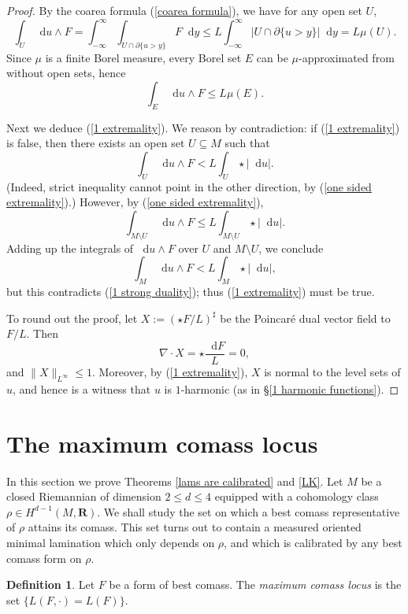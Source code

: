\documentclass[reqno,11pt]{amsart}
\newcommand{\RR}{\mathbf{R}}
\newcommand*\dif{\mathop{}\!\mathrm{d}}
\newcommand{\dfn}[1]{\emph{#1}\index{#1}}
\theoremstyle{definition}
\newtheorem{definition}[theorem]{Definition}
\numberwithin{equation}{section}
\begin{document}
\begin{proof}
By the coarea formula (\ref{coarea formula}), we have for any open set $U$,
$$\int_U \dif u \wedge F = \int_{-\infty}^\infty \int_{U \cap \partial \{u > y\}} F \dif y \leq L \int_{-\infty}^\infty |U \cap \partial \{u > y\}| \dif y = L \mu(U).$$
Since $\mu$ is a finite Borel measure, every Borel set $E$ can be $\mu$-approximated from without open sets, hence
\begin{equation}\label{one sided extremality}
\int_E \dif u \wedge F \leq L \mu(E).
\end{equation}

Next we deduce (\ref{1 extremality}).
We reason by contradiction: if (\ref{1 extremality}) is false, then there exists an open set $U \subseteq M$ such that 
$$\int_U \dif u \wedge F < L \int_U \star |\dif u|.$$
(Indeed, strict inequality cannot point in the other direction, by (\ref{one sided extremality}).)
However, by (\ref{one sided extremality}), 
$$\int_{M \setminus U} \dif u \wedge F \leq L \int_{M \setminus U} \star |\dif u|.$$
Adding up the integrals of $\dif u \wedge F$ over $U$ and $M \setminus U$, we conclude 
$$\int_M \dif u \wedge F < L \int_M \star |\dif u|,$$
but this contradicts (\ref{1 strong duality}); thus (\ref{1 extremality}) must be true.

To round out the proof, let $X := (\star F/L)^\sharp$ be the Poincar\'e dual vector field to $F/L$. Then
$$\nabla \cdot X = \star \frac{\dif F}{L} = 0,$$
and $\|X\|_{L^\infty} \leq 1$.
Moreover, by (\ref{1 extremality}), $X$ is normal to the level sets of $u$, and hence is a witness that $u$ is $1$-harmonic (as in \S\ref{1 harmonic functions}).
\end{proof}



\section{The maximum comass locus}\label{MCL sec}
In this section we prove Theorems \ref{lams are calibrated} and \ref{LK}.
Let $M$ be a closed Riemannian of dimension $2 \leq d \leq 4$ equipped with a cohomology class $\rho \in H^{d - 1}(M, \RR)$.
We shall study the set on which a best comass representative of $\rho$ attains its comass.
This set turns out to contain a measured oriented minimal lamination which only depends on $\rho$, and which is calibrated by any best comass form on $\rho$.

\begin{definition}
Let $F$ be a form of best comass.
The \dfn{maximum comass locus} is the set $\{L(F, \cdot) = L(F)\}$.
\end{definition}
\end{document}

